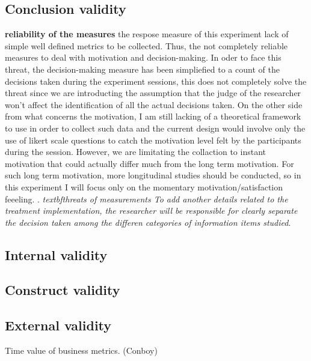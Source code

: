 \documentclass[runningheads]{llncs}
\begin{document}
\subsection{Conclusion validity}

\textbf{reliability of the measures} the respose measure of this experiment lack of simple well defined metrics to be collected. Thus, the not completely reliable measures to deal with motivation and decision-making. In oder to face this threat, the decision-making measure has been simpliefied to a count of the decisions taken during the experiment sessions, this does not completely solve the threat since we are introducting the assumption that the judge of the researcher won't affect the identification of all the actual decisions taken. On the other side from what concerns the motivation, I am still lacking of a theoretical framework to use in order to collect such data and the current design would involve only the use of likert scale questions to catch the motivation level felt by the participants during the session. However, we are limitating the collaction to instant motivation that could actually differ much from the long term motivation. For such long term motivation, more longitudinal studies should be conducted, so in this experiment I will focus only on the momentary motivation/satisfaction feeeling. \textcs{\textcolor{red}{need for theory or studies to back it up}}. \textit{textbf{threats of measurements} To add another details related to the treatment implementation, the researcher will be responsible for clearly separate the decision taken among the differen categories of information items studied}.

\subsection{Internal validity}



\subsection{Construct validity}

\subsection{External validity}


Time value of business metrics. (Conboy)


%
%
%
% 
% 
%
\end{document}
